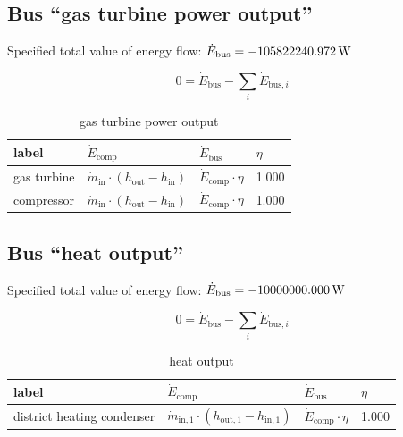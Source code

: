 \subsection{Bus ``gas turbine power output''}

Specified total value of energy flow: $\dot{E}_\mathrm{bus} = \unit[-105822240.972]{W}$

\begin{equation}
\label{eq:Bus_energy_flow_sum}
0=\dot{E}_\mathrm{bus} -\sum_i \dot{E}_{\mathrm{bus,}i}
\end{equation}

\begin{table}[H]\begin{center}
\begin{tabular}{llll}
\toprule
       label &                                                   $\dot{E}_\mathrm{comp}$ &              $\dot{E}_\mathrm{bus}$ & $\eta$ \\
\midrule
 gas turbine &  $\dot{m}_\mathrm{in} \cdot \left(h_\mathrm{out} - h_\mathrm{in} \right)$ &  $\dot{E}_\mathrm{comp} \cdot \eta$ &  1.000 \\
  compressor &  $\dot{m}_\mathrm{in} \cdot \left(h_\mathrm{out} - h_\mathrm{in} \right)$ &  $\dot{E}_\mathrm{comp} \cdot \eta$ &  1.000 \\
\bottomrule
\end{tabular}
\caption{gas turbine power output}
\end{center}\end{table}




\subsection{Bus ``heat output''}

Specified total value of energy flow: $\dot{E}_\mathrm{bus} = \unit[-10000000.000]{W}$

\begin{equation}
\label{eq:Bus_energy_flow_sum}
0=\dot{E}_\mathrm{bus} -\sum_i \dot{E}_{\mathrm{bus,}i}
\end{equation}

\begin{table}[H]\begin{center}
\begin{tabular}{llll}
\toprule
                      label &                                                         $\dot{E}_\mathrm{comp}$ &              $\dot{E}_\mathrm{bus}$ & $\eta$ \\
\midrule
 district heating condenser &  $\dot{m}_\mathrm{in,1} \cdot \left(h_\mathrm{out,1} - h_\mathrm{in,1} \right)$ &  $\dot{E}_\mathrm{comp} \cdot \eta$ &  1.000 \\
\bottomrule
\end{tabular}
\caption{heat output}
\end{center}\end{table}




